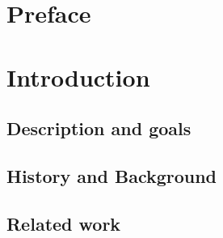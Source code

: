 \documentclass[BSP,english,oneside]{classes/gucthesis}
\begin{document}


\makefrontpages



\clearpage
\setcounter{page}{1}



\chapter*{Preface}
	\label{chap:preface}
	


\tableofcontents
\listoffigures


\newpage
{}
\chapter{Introduction}
	
		\setcounter{page}{1}	%
		\label{sec:introduction}
		

	\section{Description and goals}
		\label{sec:description_goals}
		

	\section{History and Background}
		\label{sec:history_and_background}
		

	\section{Related work}
		\label{sec:related_work}
		
\end{document}
